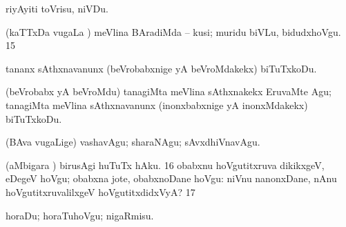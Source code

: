 {  riyAyiti toVrisu, niVDu.

  (kaTTxDa \mo vugaLa \vi) meVlina BAradiMda -- kusi; muridu
biVLu, bidudxhoVgu. 
\num{15}  

  tananx sAthxnavanunx (beVrobabxnige yA beVroMdakekx)
biTuTxkoDu. 

  (beVrobabx yA beVroMdu) tanagiMta meVlina sAthxnakekx
EruvaMte Agu; tanagiMta meVlina sAthxnavanunx (inonxbabxnige yA
inonxMdakekx) biTuTxkoDu. 

  (BAva \mo vugaLige) vashavAgu; sharaNAgu; sAvxdhiVnavAgu. 

  (aMbigara \vi) birusAgi huTuTx hAku. 
\num{16}  obabxnu hoVgutitxruva dikikxgeV,
eDegeV hoVgu; obabxna jote, obabxnoDane hoVgu:  niVnu nanonxDane, nAnu hoVgutitxruvalilxgeV hoVgutitxdidxVyA? 
\num{17}  

  horaDu; horaTuhoVgu; nigaRmisu. 

}
